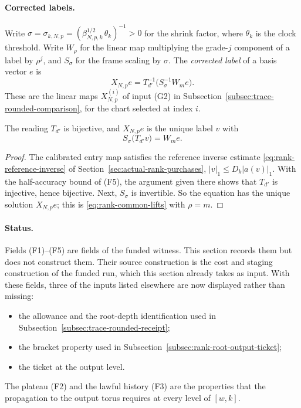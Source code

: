 \paragraph{Corrected labels.}
Write $\sigma=\sigma_{k,N,p}=(\beta_{N,p,k}^{1/2}\,\theta_k)^{-1}>0$ for
the shrink factor, where $\theta_k$ is the clock threshold. Write $W_\rho$
for the linear map multiplying the grade-$j$ component of a label by
$\rho^j$, and $S_\sigma$ for the frame scaling by $\sigma$. The
\emph{corrected label} of a basis vector $e$ is
\[
 X_{N,p}e=T_{d'}^{-1}\bigl(S_{\sigma}^{-1}W_me\bigr).
\]
These are the linear maps $X^{(i)}_{N,p}$ of input (G2) in
Subsection~\ref{subsec:trace-rounded-comparison}, for the chart selected at index
$i$.

\begin{lemma}
\label{lem:ex-lattice-firesky-solves}
The reading $T_{d'}$ is bijective, and $X_{N,p}e$ is the unique label $v$
with
\begin{equation}\label{eq:ex-lattice-firesky-solves}
 S_\sigma\bigl(T_{d'}v\bigr)=W_me .
\end{equation}
\end{lemma}
\begin{proof}
The calibrated entry map satisfies the reference inverse estimate
\eqref{eq:rank-reference-inverse} of
Section~\ref{sec:actual-rank-purchases}, $|v|_1\le D_k|a(v)|_1$. With the
half-accuracy bound of (F5), the argument given there shows that $T_{d'}$
is injective, hence bijective. Next, $S_\sigma$ is invertible. So the
equation has the unique solution $X_{N,p}e$; this is
\eqref{eq:rank-common-lifts} with $\rho=m$.
\end{proof}

\paragraph{Status.} Fields (F1)--(F5) are fields of the funded witness.
This section records them but does not construct them. Their source
construction is the cost and staging construction of the funded run,
which this section already takes as input. With these fields, three
of the inputs listed elsewhere are now displayed rather than missing:
\begin{itemize}
\item the allowance and the root-depth identification used in
 Subsection~\ref{subsec:trace-rounded-receipt};
\item the bracket property used in
 Subsection~\ref{subsec:rank-root-output-ticket};
\item the ticket at the output level.
\end{itemize}
The plateau (F2) and the lawful history (F3) are the properties that the
propagation to the output torus requires at every level of $[w,k]$.

